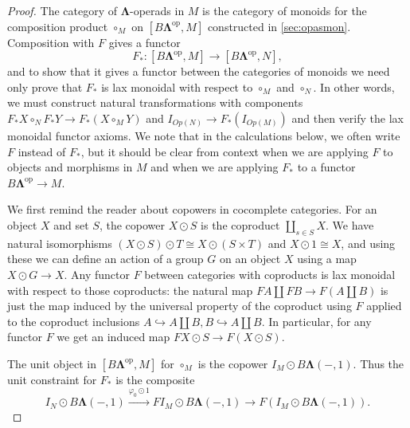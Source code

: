 \documentclass{amsbook} %
\newcommand{\mb}{\mathbf}
\numberwithin{section}{chapter}
\begin{document}
\begin{proof}
The category of $\mb{\Lambda}$-operads in $M$ is the category of monoids for the composition product $\circ_{M}$ on $[B\mb{\Lambda}^{\textrm{op}}, M]$ constructed in \cref{sec:opasmon}.  Composition with $F$ gives a functor
\[
F_{*}: [B\mb{\Lambda}^{\textrm{op}}, M] \rightarrow [B\mb{\Lambda}^{\textrm{op}}, N],
\]
and to show that it gives a functor between the categories of monoids we need only prove that $F_{*}$ is lax monoidal with respect to $\circ_{M}$ and $\circ_{N}$.  In other words, we must construct natural transformations with components $F_{*}X \circ_{N} F_{*}Y \rightarrow F_{*}(X \circ_{M} Y)$ and $I_{Op(N)} \rightarrow F_{*}(I_{Op(M)})$ and then verify the lax monoidal functor axioms.  We note that in the calculations below, we often write $F$ instead of $F_{*}$, but it should be clear from context when we are applying $F$ to objects and morphisms in $M$ and when we are applying $F_{*}$ to a functor $ B\mb{\Lambda}^{\textrm{op}} \to M$.

We first remind the reader about copowers in cocomplete categories.  For an object $X$ and set $S$, the copower $X \odot S$ is the coproduct $\coprod_{s \in S} X$.  We have natural isomorphisms $(X \odot S) \odot T \cong X \odot (S \times T)$ and $X \odot 1 \cong X$, and using these we can define an action of a group $G$ on an object $X$ using a map $X \odot G \rightarrow X$.  Any functor $F$ between categories with coproducts is lax monoidal with respect to those coproducts:  the natural map $FA \coprod FB \rightarrow F(A \coprod B)$ is just the map induced by the universal property of the coproduct using $F$ applied to the coproduct inclusions $A \hookrightarrow A \coprod B, B \hookrightarrow A \coprod B$.  In particular, for any functor $F$ we get an induced map $FX \odot S \rightarrow F(X \odot S)$.

The unit object in $[B\mb{\Lambda}^{\textrm{op}}, M]$ for $\circ_{M}$ is the copower $I_{M} \odot B\mb{\Lambda}(-,1)$.  Thus the unit constraint for $F_{*}$ is the composite
\[
I_{N} \odot B\mb{\Lambda}(-,1) \stackrel{\varphi_{0} \odot 1}{\longrightarrow} FI_{M} \odot B\mb{\Lambda}(-,1) \rightarrow F(I_{M} \odot B\mb{\Lambda}(-,1) ).
\]


\end{proof}
\end{document}
